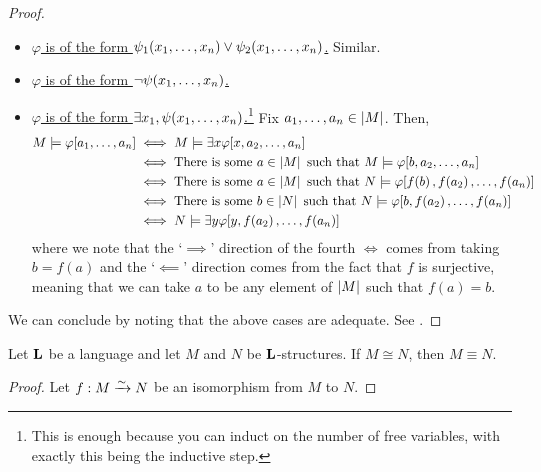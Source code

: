 \begin{proof}
\begin{itemize}
        \item \underline{$\varphi$ is of the form $\psi_1\!\left( x_1, \ldots, x_n \right) \lor \psi_2\!\left( x_1, \ldots, x_n \right)$.}
        Similar.

        \item \underline{$\varphi$ is of the form $\neg \psi\!\left( x_1, \ldots, x_n \right)$.}
        \sorry

        \item \underline{$\varphi$ is of the form $\exists x_1, \psi\!\left( x_1, \ldots, x_n \right)$.}\footnote{This is enough because you can induct on the number of free variables, with exactly this being the inductive step.}
        Fix $a_1, \ldots, a_n \in \left\lvert M \right\rvert$. Then,
        \begin{align*}
            M \models \varphi\!\brac{a_1, \ldots, a_n}
            &\iff
            M \models \exists x \varphi\!\brac{x, a_2, \ldots, a_n} \\
            &\iff
            \text{There is some } a \in \abs{M} \text{ such that } M \models \varphi\!\brac{b, a_2, \ldots, a_n} \\
            &\iff \text{There is some } a \in \abs{M} \text{ such that } N \models \varphi\!\brac{f\of{b}, f\of{a_2}, \ldots, f\of{a_n}} \\
            &\iff \text{There is some } b \in \abs{N} \text{ such that } N \models \varphi\!\brac{b, f\of{a_2}, \ldots, f\of{a_n}} \\
            &\iff N \models \exists y \varphi\!\brac{y, f\of{a_2}, \ldots, f\of{a_n}}
        \end{align*}
        where we note that the `$\implies$' direction of the fourth $\iff$ comes from taking $b = f(a)$ and the `$\impliedby$' direction comes from the fact that $f$ is surjective, meaning that we can take $a$ to be any element of $\left\lvert M \right\rvert$ such that $f(a) = b$.
    \end{itemize}
    We can conclude by noting that the above cases are adequate. See \sorry. %
\end{proof}

\begin{boxcorollary}
    Let $\mathbf{L}$ be a language and let $M$ and $N$ be $\mathbf{L}$-structures. If $M \cong N$, then $M \equiv N$.
\end{boxcorollary}
\begin{proof}
    Let $f : M \xrightarrow{\sim} N$ be an isomorphism from $M$ to $N$. \sorry
\end{proof}

